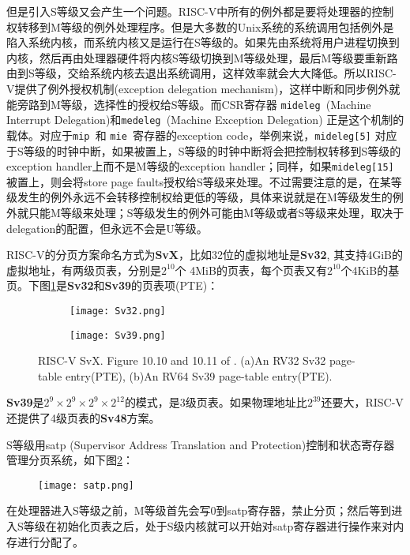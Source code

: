 \begin{enumerate}
	但是引入S等级又会产生一个问题。RISC-V中所有的例外都是要将处理器的控制权转移到M等级的例外处理程序。但是大多数的Unix系统的系统调用包括例外是陷入系统内核，而系统内核又是运行在S等级的。如果先由系统将用户进程切换到内核，然后再由处理器硬件将内核S等级切换到M等级处理，最后M等级要重新路由到S等级，交给系统内核去退出系统调用\citep{Patterson:2017:RRO:3202479}，这样效率就会大大降低。所以RISC-V提供了例外授权机制(exception delegation mechanism)，这样中断和同步例外就能旁路到M等级，选择性的授权给S等级。而CSR寄存器 {\tt mideleg }(Machine Interrupt Delegation)和{\tt medeleg }(Machine Exception  Delegation) 正是这个机制的载体。对应于{\tt mip }和 {\tt mie }寄存器的exception code，举例来说，{\tt mideleg[5]} 对应于S等级的时钟中断，如果被置上，S等级的时钟中断将会把控制权转移到S等级的exception handler上而不是M等级的exception handler；同样，如果{\tt mideleg[15]}被置上，则会将store page faults授权给S等级来处理\citep{Patterson:2017:RRO:3202479}。不过需要注意的是，在某等级发生的例外永远不会转移控制权给更低的等级，具体来说就是在M等级发生的例外就只能M等级来处理；S等级发生的例外可能由M等级或者S等级来处理，取决于delegation的配置，但永远不会是U等级\cite{Patterson:2017:RRO:3202479}。
	
	RISC-V的分页方案命名方式为\textbf{SvX}，比如32位的虚拟地址是\textbf{Sv32}, 其支持4GiB的虚拟地址，有两级页表，分别是$ 2^{10} $个 4MiB的页表，每个页表又有$ 2^{10} $个4KiB的基页。下图\ref{fig:SvX}是\textbf{Sv32}和\textbf{Sv39}的页表项(PTE)：
	\begin{figure}[!htbp]
		\centering
		\begin{subfigure}[b]{0.7\textwidth}
			\texttt{[image: Sv32.png]}
			\caption{}
		\end{subfigure}%
		
		\begin{subfigure}[b]{\textwidth}
			\texttt{[image: Sv39.png]}
			\caption{}
		\end{subfigure}%
		{RISC-V SvX. Figure 10.10 and 10.11 of \citep{Patterson:2017:RRO:3202479}. (a)An RV32 Sv32 page-table entry(PTE), (b)An RV64 Sv39 page-table entry(PTE).}
		\label{fig:SvX}
	\end{figure}
	\textbf{Sv39}是$ 2^9\times 2^9\times 2^9 \times 2^{12} $的模式，是3级页表。如果物理地址比$ 2^{39} $还要大，RISC-V还提供了4级页表的\textbf{Sv48}方案。
	
	S等级用satp (Supervisor Address Translation and Protection)控制和状态寄存器管理分页系统，如下图\ref{fig:satp}：
	\begin{figure}[!htbp]
		\centering
		\texttt{[image: satp.png]}
		\label{fig:satp}
	\end{figure}
	在处理器进入S等级之前，M等级首先会写0到satp寄存器，禁止分页；然后等到进入S等级在初始化页表之后，处于S级内核就可以开始对satp寄存器进行操作来对内存进行分配了。
\end{enumerate}

